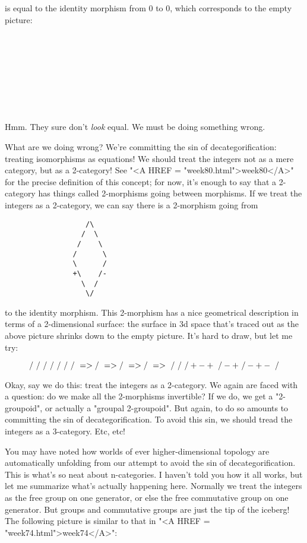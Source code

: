 is equal to the identity morphism from 0 to 0, which corresponds to the
empty picture:
\begin{verbatim}









\end{verbatim}
    
Hmm.  They sure don't \emph{look} equal.  We must be doing something wrong.

What are we doing wrong?  We're committing the sin of
decategorification: treating isomorphisms as equations!  We should treat
the integers not as a mere category, but as a 2-category!  See "<A HREF = "week80.html">week80</A>"
for the precise definition of this concept; for now, it's enough to say
that a 2-category has things called 2-morphisms going between morphisms.
If we treat the integers as a 2-category, we can say there is a
2-morphism going from

\begin{verbatim}
                   /\
                  /  \
                 /    \
                /      \
                \      /
                +\    /-
                  \  /
                   \/

\end{verbatim}
    
to the identity morphism.  This 2-morphism has a nice geometrical
description in terms of a 2-dimensional surface: the surface in
3d space that's traced out as the above picture shrinks down to the 
empty picture.  It's hard to draw, but let me try:

$$
                   /\
                  /  \           /\
                 /    \         /  \       /\
                /      \   =>  /    \  => /  \  => /\  =>
                \      /       \    /     \  /    +\/-
                +\    /-       +\  /-     +\/-
                  \  /           \/
                   \/


$$
    
Okay, say we do this: treat the integers as a 2-category.  We again are
faced with a question: do we make all the 2-morphisms invertible?  If we
do, we get a "2-groupoid", or actually a "groupal 2-groupoid".  But
again, to do so amounts to committing the sin of decategorification.  To
avoid this sin, we should tread the integers as a 3-category.  Etc, etc!

You may have noted how worlds of ever higher-dimensional topology are
automatically unfolding from our attempt to avoid the sin of
decategorification.  This is what's so neat about n-categories.  I
haven't told you how it all works, but let me summarize what's actually
happening here.  Normally we treat the integers as the free group on
one generator, or else the free commutative group on one generator.  
But groups and commutative groups are just the tip of the iceberg!
The following picture is similar to that in "<A HREF = "week74.html">week74</A>":

